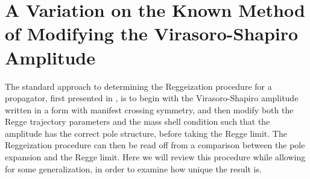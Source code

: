 \documentclass[aps, prd, preprintnumbers, floatfix, showpacs, showkeys, nofootinbib, 10pt]{revtex4-1}
\begin{document}
\section{\label{mod1} A Variation on the Known Method of Modifying the Virasoro-Shapiro Amplitude}

The standard approach to determining the Reggeization procedure for a propagator, first presented in \cite{DHM}, is to begin with the Virasoro-Shapiro amplitude written in a form with manifest crossing symmetry, and then modify both the Regge trajectory parameters and the mass shell condition such that the amplitude has the correct pole structure, before taking the Regge limit.  The Reggeization procedure can then be read off from a comparison between the pole expansion and the Regge limit.  Here we will review this procedure while allowing for some generalization, in order to examine how unique the result is.  
\end{document}
